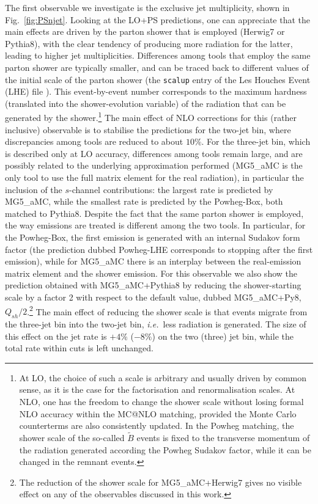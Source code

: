 \documentclass[twocolumn,epjc3]{svjour3} %
\begin{document}
The first observable we investigate is the exclusive jet multiplicity, shown in Fig.~\ref{fig:PSnjet}. Looking at the LO+PS predictions, one can appreciate that the
main effects are driven by the parton shower that is employed ({\sc Herwig7} or {\sc Pythia8}), with the clear tendency of producing more radiation for the latter,
leading to higher jet multiplicities. Differences among tools that employ the same parton shower are typically smaller, and can be traced back to different values of the
initial scale of the parton shower (the {\tt scalup} entry of the Les Houches Event (LHE) file \cite{Alwall:2006yp,Butterworth:2010ym}). This event-by-event number corresponds
to the maximum hardness (translated into the shower-evolution variable) of the radiation that
can be generated by the shower.\footnote{At LO, the choice of such a scale is arbitrary and usually driven by common sense,
as it is the case for the factorisation and renormalisation scales.
    At NLO, one has the freedom to change the shower scale without losing formal NLO accuracy within the {\sc MC@NLO} matching,
    provided the Monte Carlo counterterms are also consistently
updated. In the {\sc Powheg} matching, the shower scale of the so-called $\tilde B$ events is fixed to the transverse momentum of the radiation
generated according the {\sc Powheg} Sudakov factor, while it can be changed in the remnant events.}
The main effect of NLO corrections for this (rather inclusive) observable is to stabilise the predictions for the two-jet bin, where discrepancies
among tools are reduced to about $10\%$. For the three-jet bin, which is described only at LO accuracy, differences among tools remain large, and are
possibly related to the underlying approximation performed ({\sc MG5\_aMC} is the only tool to use the full matrix element for the real radiation), in particular the inclusion of the $s$-channel contributions: the largest rate is predicted by
{\sc MG5\_aMC}, while the smallest rate is predicted by the {\sc Powheg-Box}, both matched to {\sc Pythia8}. Despite the fact that the same parton shower is employed, the way emissions are treated
is different among the two tools. In particular, for the {\sc Powheg-Box}, the first emission is generated with an internal Sudakov form factor (the
prediction dubbed {\sc Powheg-LHE} corresponds to stopping after the first emission), while for {\sc MG5\_aMC} there is an
interplay between the real-emission matrix element and the shower emission. For this observable we also show the prediction obtained
with {\sc MG5\_aMC+Pythia8} by reducing the shower-starting scale by a factor 2 with respect to the default value, dubbed 
{\sc MG5\_aMC+Py8, $Q_{sh}/2$}.\footnote{The reduction of the shower scale for {\sc MG5\_aMC+Herwig7} gives no visible effect on any of the observables 
discussed in this work.} The main effect of reducing the shower scale is that events migrate from the three-jet bin into the two-jet bin, \emph{i.e.}\ less radiation is generated. The
size of this effect on the jet rate is $+4\%$ ($-8\%$) on the two (three) jet bin, while the total rate within cuts is left unchanged.  
\end{document}
